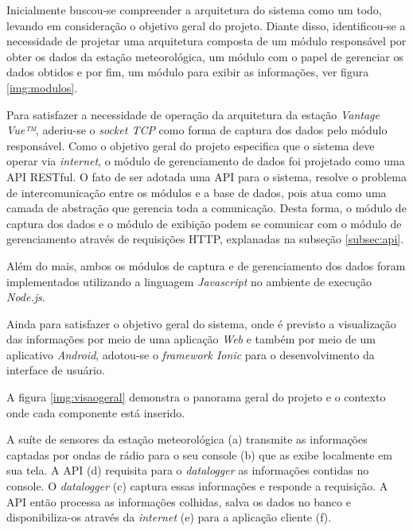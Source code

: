 Inicialmente buscou-se compreender a arquitetura do sistema como um todo, levando em consideração o objetivo geral do projeto. Diante disso, identificou-se a necessidade de projetar uma arquitetura composta de um módulo responsável por obter os dados da estação meteorológica, um módulo com o papel de gerenciar os dados obtidos e por fim, um módulo para exibir as informações, ver figura \ref{img:modulos}.


Para satisfazer a necessidade de operação da arquitetura da estação \textit{Vantage Vue™}, aderiu-se o \textit{socket TCP} como forma de captura dos dados pelo módulo responsável. Como o objetivo geral do projeto especifica que o sistema deve operar via \textit{internet}, o módulo de gerenciamento de dados foi projetado como uma API RESTful. O fato de ser adotada uma API para o sistema, resolve o problema de intercomunicação entre os módulos e a base de dados, pois atua como uma camada de abstração que gerencia toda a comunicação. Desta forma, o módulo de captura dos dados e o módulo de exibição podem se comunicar com o módulo de gerenciamento através de requisições HTTP, explanadas na subseção \ref{subsec:api}.

Além do mais, ambos os módulos de captura e de gerenciamento dos dados foram implementados utilizando a linguagem \textit{Javascript} no ambiente de execução \textit{Node.js}.
 
Ainda para satisfazer o objetivo geral do sistema, onde é previsto a visualização das informações por meio de uma aplicação \textit{Web} e também por meio de um aplicativo \textit{Android}, adotou-se o \textit{framework Ionic} para o desenvolvimento da interface de usuário.

A figura \ref{img:visaogeral}  demonstra o panorama geral do projeto e o contexto onde cada componente está inserido.


\newpage

A suíte de sensores da estação meteorológica (a) transmite as informações captadas por ondas de rádio para o seu console (b) que as exibe localmente em sua tela. A API (d) requisita para o \textit{datalogger} as informações contidas no console. O \textit{datalogger} (c) captura essas informações e responde a requisição. A API então processa as informações colhidas, salva os dados no banco e disponibiliza-os através da \textit{internet} (e) para a aplicação cliente (f).



